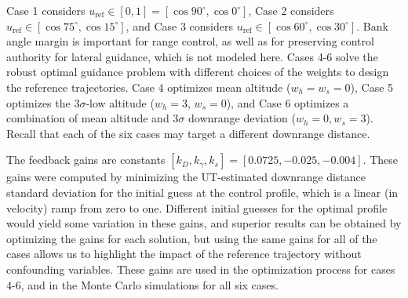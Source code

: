 \documentclass[journal ]{new-aiaa}
\begin{document}
Case 1 considers $u_{\mathrm{ref}}\in[0,1] = [\cos90^{\circ},\cos0^{\circ}]$, Case 2 considers $u_{\mathrm{ref}}\in [\cos75^{\circ},\cos15^{\circ}]$, and Case 3 considers $u_{\mathrm{ref}}\in [\cos60^{\circ},\cos30^{\circ}]$.
Bank angle margin is important for range control, as well as for preserving control authority for lateral guidance, which is not modeled here. 
Cases 4-6 solve the robust optimal guidance problem with different choices of the weights to design the reference trajectories. Case 4 optimizes mean altitude ($ w_h=w_s=0 $), Case 5 optimizes the 3$\sigma$-low altitude ($ w_h=3,\,w_s=0 $), and Case 6 optimizes a combination of mean altitude and 3$\sigma$ downrange deviation ($ w_h=0, w_s=3 $). Recall that each of the six cases may target a different downrange distance.

The feedback gains are constants $[k_D, k_{\gamma}, k_s] = [0.0725, -0.025, -0.004]$.  These gains were computed by minimizing the UT-estimated downrange distance standard deviation for the initial guess at the control profile, which is a linear (in velocity) ramp from zero to one. Different initial guesses for the optimal profile would yield some variation in these gains, and superior results can be obtained by optimizing the gains for each solution, but using the same gains for all of the cases allows us to highlight the impact of the reference trajectory without confounding variables. These gains are used in the optimization process for cases 4-6, and in the Monte Carlo simulations for all six cases. 
\end{document}
